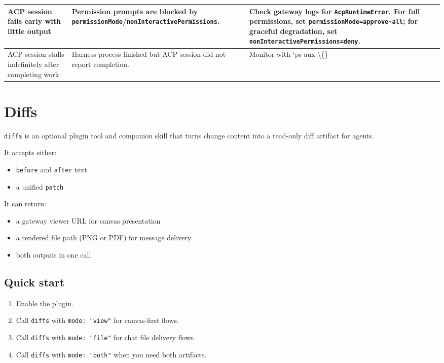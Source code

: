 \begin{table}[h]
\begin{tabular}{|l|l|l|}
\hline
ACP session fails early with little output & Permission prompts are blocked by \texttt{permissionMode}/\texttt{nonInteractivePermissions}. & Check gateway logs for \texttt{AcpRuntimeError}. For full permissions, set \texttt{permissionMode=approve-all}; for graceful degradation, set \texttt{nonInteractivePermissions=deny}. \\
\hline
ACP session stalls indefinitely after completing work & Harness process finished but ACP session did not report completion. & Monitor with `ps aux \textbackslash\{\} \\
\hline
\end{tabular}
\end{table}




\clearpage

\section{Diffs}


\texttt{diffs} is an optional plugin tool and companion skill that turns change content into a read-only diff artifact for agents.

It accepts either:

\begin{itemize}
  \item \texttt{before} and \texttt{after} text
  \item a unified \texttt{patch}
\end{itemize}


It can return:

\begin{itemize}
  \item a gateway viewer URL for canvas presentation
  \item a rendered file path (PNG or PDF) for message delivery
  \item both outputs in one call
\end{itemize}


\subsection{Quick start}


\begin{enumerate}
  \item Enable the plugin.
  \item Call \texttt{diffs} with \texttt{mode: "view"} for canvas-first flows.
  \item Call \texttt{diffs} with \texttt{mode: "file"} for chat file delivery flows.
  \item Call \texttt{diffs} with \texttt{mode: "both"} when you need both artifacts.
\end{enumerate}


